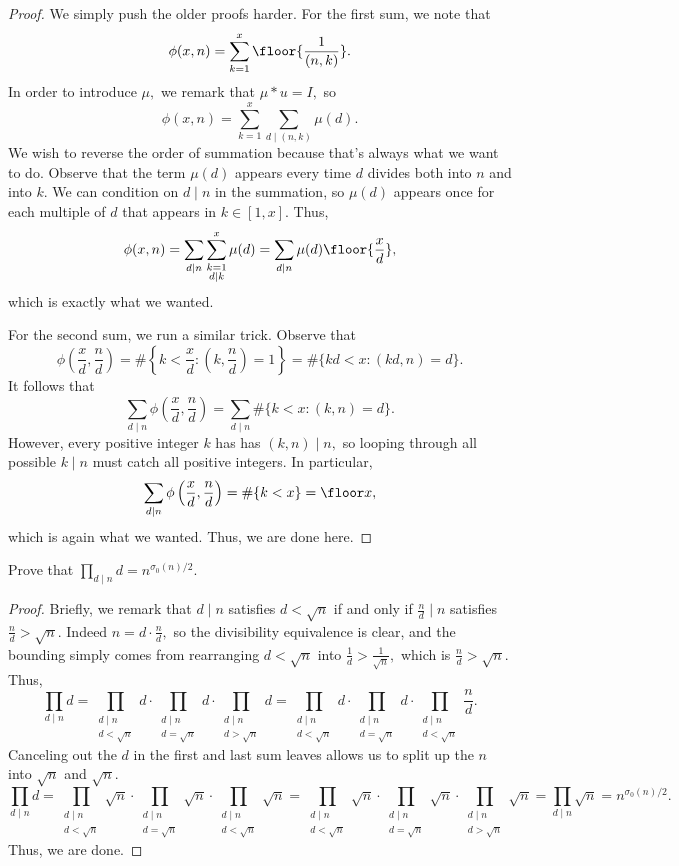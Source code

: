 \begin{proof}
We simply push the older proofs harder. For the first sum, we note that
\[\phi(x,n)=\sum_{k=1}^x\floor{\frac1{(n,k)}}.\]
In order to introduce $\mu,$ we remark that $\mu*u=I,$ so
\[\phi(x,n)=\sum_{k=1}^x\sum_{d\mid(n,k)}\mu(d).\]
We wish to reverse the order of summation because that's always what we want to do. Observe that the term $\mu(d)$ appears every time $d$ divides both into $n$ and into $k.$ We can condition on $d\mid n$ in the summation, so $\mu(d)$ appears once for each multiple of $d$ that appears in $k\in[1,x].$ Thus,
\[\phi(x,n)=\sum_{d\mid n}\sum_{\substack{k=1\\d\mid k}}^x\mu(d)=\sum_{d\mid n}\mu(d)\floor{\frac xd},\]
which is exactly what we wanted.

For the second sum, we run a similar trick. Observe that
\[\phi\left(\frac xd,\frac nd\right)=\#\left\{k<\frac xd:\left(k,\frac nd\right)=1\right\}=\#\{kd<x:(kd,n)=d\}.\]
It follows that
\[\sum_{d\mid n}\phi\left(\frac xd,\frac nd\right)=\sum_{d\mid n}\#\{k<x:(k,n)=d\}.\]
However, every positive integer $k$ has has $(k,n)\mid n,$ so looping through all possible $k\mid n$ must catch all positive integers. In particular,
\[\sum_{d\mid n}\phi\left(\frac xd,\frac nd\right)=\#\{k<x\}=\floor x,\]
which is again what we wanted. Thus, we are done here.
\end{proof}

\begin{exercise}
Prove that $\prod_{d\mid n}d=n^{\sigma_0(n)/2}.$
\end{exercise}

\begin{proof}
Briefly, we remark that $d\mid n$ satisfies $d<\sqrt n$ if and only if $\frac nd\mid n$ satisfies $\frac nd>\sqrt n.$ Indeed $n=d\cdot\frac nd,$ so the divisibility equivalence is clear, and the bounding simply comes from rearranging $d<\sqrt n$ into $\frac1d>\frac1{\sqrt n},$ which is $\frac nd>\sqrt n.$ Thus,
\[\prod_{d\mid n}d=\prod_{\substack{d\mid n\\d<\sqrt n}}d\cdot\prod_{\substack{d\mid n\\d=\sqrt n}}d\cdot\prod_{\substack{d\mid n\\d>\sqrt n}}d=\prod_{\substack{d\mid n\\d<\sqrt n}}d\cdot\prod_{\substack{d\mid n\\d=\sqrt n}}d\cdot\prod_{\substack{d\mid n\\d<\sqrt n}}\frac nd.\]
Canceling out the $d$ in the first and last sum leaves allows us to split up the $n$ into $\sqrt n$ and $\sqrt n.$
\[\prod_{d\mid n}d=\prod_{\substack{d\mid n\\d<\sqrt n}}\sqrt n\cdot\prod_{\substack{d\mid n\\d=\sqrt n}}\sqrt n\cdot\prod_{\substack{d\mid n\\d<\sqrt n}}\sqrt n=\prod_{\substack{d\mid n\\d<\sqrt n}}\sqrt n\cdot\prod_{\substack{d\mid n\\d=\sqrt n}}\sqrt n\cdot\prod_{\substack{d\mid n\\d>\sqrt n}}\sqrt n=\prod_{d\mid n}\sqrt n=n^{\sigma_0(n)/2}.\]
Thus, we are done.
\end{proof}

